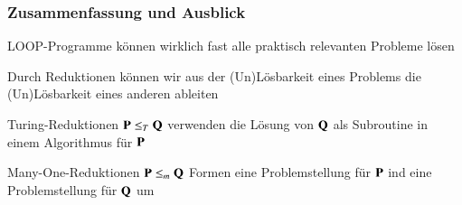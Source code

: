 \documentclass[onlymath]{beamer}
\begin{document}
\begin{frame}\frametitle{Zusammenfassung und Ausblick}

LOOP-Programme können wirklich fast alle praktisch relevanten Probleme lösen
\bigskip

Durch Reduktionen können wir aus der (Un)Lösbarkeit eines Problems die (Un)Lösbarkeit eines anderen ableiten\bigskip

Turing-Reduktionen $\textbf{\textcolor{black}{P}}\leq_T\textbf{\textcolor{black}{Q}}$ verwenden die Lösung von $\textbf{\textcolor{black}{Q}}$ als Subroutine in einem Algorithmus für $\textbf{\textcolor{black}{P}}$
\bigskip

Many-One-Reduktionen $\textbf{\textcolor{black}{P}}\leq_m\textbf{\textcolor{black}{Q}}$ Formen eine Problemstellung für $\textbf{\textcolor{black}{P}}$ ind eine Problemstellung für $\textbf{\textcolor{black}{Q}}$ um
\bigskip


\end{frame}

% 
% 
\end{document}
